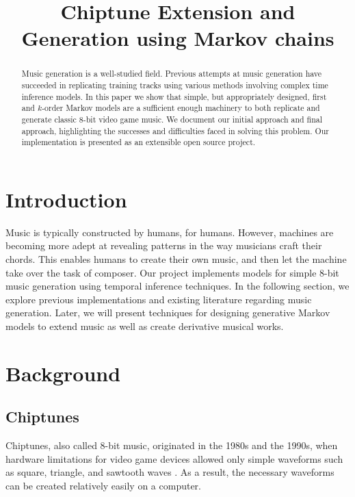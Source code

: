 \documentclass{article}
\title{Chiptune Extension and Generation using Markov chains}
\begin{document}
\maketitle


\begin{abstract}
Music generation is a well-studied field. Previous attempts at music generation have succeeded in replicating training tracks using various methods involving complex 
time inference models. In this paper we show that simple, but appropriately designed, first and $k$-order Markov models are a sufficient enough machinery to both 
replicate and generate classic 8-bit video game music. We document our initial approach and final approach, highlighting the successes and difficulties faced in 
solving this problem. Our implementation is presented as an extensible open source project.
\end{abstract}

\section{Introduction}
Music is typically constructed by humans, for humans. However, machines are becoming more adept at revealing patterns in the way musicians craft their chords. 
This enables humans to create their own music, and then let the machine take over the task of composer. Our project implements models for simple 8-bit music 
generation using temporal inference techniques. In the following section, we explore previous implementations and existing literature regarding music generation. 
Later, we will present techniques for designing generative Markov models to extend music as well as create derivative musical works.

\section{Background}
\subsection{Chiptunes}
Chiptunes, also called 8-bit music, originated in the 1980s and the 1990s, when hardware limitations for video game devices allowed only simple waveforms such as 
square, triangle, and sawtooth waves \cite{pop_chiptunes}.  As a result, the necessary waveforms can be created relatively easily on a computer. 
\end{document}
